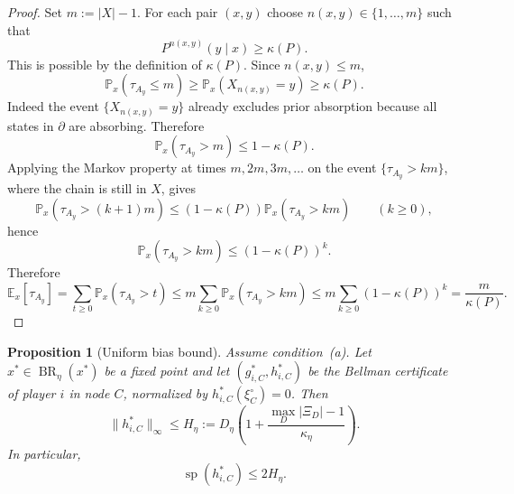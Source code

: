 \documentclass[12pt]{article}
\newtheorem{proposition}[theorem]{Proposition}
\theoremstyle{definition}
\newcommand{\E}{\mathbb{E}}
\newcommand{\Pb}{\mathbb{P}}
\newcommand{\1}{\mathbf{1}}
\DeclareMathOperator{\spn}{sp}
\DeclareMathOperator{\BR}{BR}
\begin{document}
\begin{proof}
Set $m:=|X|-1$. For each pair $(x,y)$ choose
$n(x,y)\in\{1,\dots,m\}$ such that
\[
P^{n(x,y)}(y\mid x)\ge \kappa(P).
\]
This is possible by the definition of $\kappa(P)$. Since $n(x,y)\le m$,
\[
\Pb_x(\tau_{A_y}\le m)\ge \Pb_x(X_{n(x,y)}=y)\ge \kappa(P).
\]
Indeed the event $\{X_{n(x,y)}=y\}$ already excludes prior absorption because all
states in $\partial$ are absorbing. Therefore
\[
\Pb_x(\tau_{A_y}>m)\le 1-\kappa(P).
\]
Applying the Markov property at times $m,2m,3m,\dots$ on the event
$\{\tau_{A_y}>km\}$, where the chain is still in $X$, gives
\[
\Pb_x(\tau_{A_y}>(k+1)m)\le (1-\kappa(P))\Pb_x(\tau_{A_y}>km)
\qquad (k\ge 0),
\]
hence
\[
\Pb_x(\tau_{A_y}>km)\le (1-\kappa(P))^k.
\]
Therefore
\[
\E_x[\tau_{A_y}]
=
\sum_{t\ge 0}\Pb_x(\tau_{A_y}>t)
\le
m\sum_{k\ge 0}\Pb_x(\tau_{A_y}>km)
\le
m\sum_{k\ge 0}(1-\kappa(P))^k
=
\frac{m}{\kappa(P)}.
\]
\end{proof}


\begin{proposition}[Uniform bias bound]
\label{prop:bias-span}
Assume condition~\textnormal{(a)}. Let $x^*\in\BR_\eta(x^*)$ be a fixed point and
let $(g_{i,C}^*,h_{i,C}^*)$ be the Bellman certificate of player $i$ in node $C$,
normalized by $h_{i,C}^*(\xi_C^\circ)=0$. Then
\[
\|h_{i,C}^*\|_\infty\le
H_\eta:=D_\eta\left(1+\frac{\max_D|\Xi_D|-1}{\kappa_\eta}\right).
\]
In particular,
\[
\spn(h_{i,C}^*)\le 2H_\eta.
\]
\end{proposition}
\end{document}
